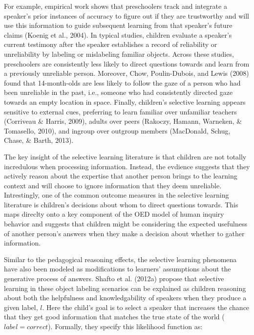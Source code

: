 \documentclass[english,floatsintext,man]{apa6}
\theoremstyle{definition}
\theoremstyle{definition}
\theoremstyle{definition}
\theoremstyle{remark}
\begin{document}
For example, empirical work shows that preschoolers track and integrate
a speaker's prior instances of accuracy to figure out if they are
trustworthy and will use this information to guide subsequent learning
from that speaker's future claims (Koenig et al., 2004). In typical
studies, children evaluate a speaker's current testimony after the
speaker establishes a record of reliability or unreliability by labeling
or mislabeling familiar objects. Across these studies, preschoolers are
consistently less likely to direct questions towards and learn from a
previously unreliable person. Moreover, Chow, Poulin-Dubois, and Lewis
(2008) found that 14-month-olds are less likely to follow the gaze of a
person who had been unreliable in the past, i.e., someone who had
consistently directed gaze towards an empty location in space. Finally,
children's selective learning appears sensitive to external cues,
preferring to learn familiar over unfamiliar teachers (Corriveau \&
Harris, 2009), adults over peers (Rakoczy, Hamann, Warneken, \&
Tomasello, 2010), and ingroup over outgroup members (MacDonald, Schug,
Chase, \& Barth, 2013).

The key insight of the selective learning literature is that children
are not totally incredulous when processing information. Instead, the
evdience suggests that they actively reason about the expertise that
another person brings to the learning context and will choose to ignore
information that they deem unreliable. Intrestingly, one of the common
outcome measures in the selective learning literature is children's
decisions about whom to direct questions towards. This maps direclty
onto a key component of the OED model of human inquiry behavior and
suggests that children might be considering the expected usefulness of
another person's answers when they make a decision about whether to
gather information.

Similar to the pedagogical reasoning effects, the selective learning
phenomena have also been modeled as modifications to learners'
assumptions about the generative process of answers. Shafto et al.
(2012a) propose that selective learning in these object labeling
scenarios can be explained as children reasoning about both the
helpfulness and knowledgability of speakers when they produce a given
label, \(l\). Here the child's goal is to select a speaker that
increases the chance that they get good information that matches the
true state of the world (\(label=correct\)). Formally, they specify this
likelihood function as:
\end{document}

